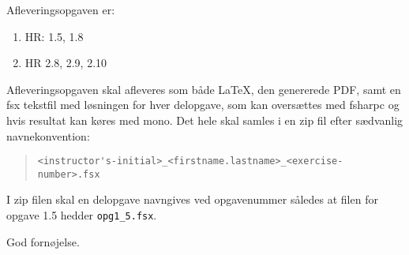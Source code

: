 \documentclass[a4paper,12pt]{article}
\begin{document}
Afleveringsopgaven er:
\begin{enumerate}[resume*]
\item HR: 1.5, 1.8
\item HR 2.8, 2.9, 2.10
\end{enumerate}
Afleveringsopgaven skal afleveres som både LaTeX, den genererede PDF, samt en fsx tekstfil med løsningen for hver delopgave, som kan oversættes med fsharpc og hvis resultat kan køres med mono. Det hele skal samles i en zip fil efter sædvanlig navnekonvention:
\begin{quote}
  \lstinline|<instructor's-initial>_<firstname.lastname>_<exercise-number>.fsx|
\end{quote}
I zip filen skal en delopgave navngives ved opgavenummer således at filen for opgave 1.5 hedder \lstinline|opg1_5.fsx|.

\flushright God fornøjelse.
\end{document}
